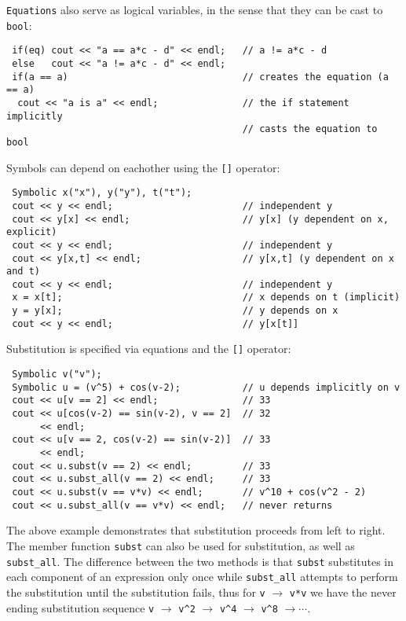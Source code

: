 \documentclass[12pt,a4paper]{report}
\begin{document}
\verb|Equations| also serve as logical variables, in the sense that they
can be cast to \verb|bool|:
\begin{verbatim}
 if(eq) cout << "a == a*c - d" << endl;   // a != a*c - d
 else   cout << "a != a*c - d" << endl;
 if(a == a)                               // creates the equation (a == a)
  cout << "a is a" << endl;               // the if statement implicitly
                                          // casts the equation to bool
\end{verbatim}

Symbols can depend on eachother using the \verb|[]| operator:
\begin{verbatim}
 Symbolic x("x"), y("y"), t("t");
 cout << y << endl;                       // independent y
 cout << y[x] << endl;                    // y[x] (y dependent on x, explicit)
 cout << y << endl;                       // independent y
 cout << y[x,t] << endl;                  // y[x,t] (y dependent on x and t)
 cout << y << endl;                       // independent y
 x = x[t];                                // x depends on t (implicit)
 y = y[x];                                // y depends on x
 cout << y << endl;                       // y[x[t]]
\end{verbatim}

Substitution is specified via equations and the \verb|[]| operator:
\begin{verbatim}
 Symbolic v("v");
 Symbolic u = (v^5) + cos(v-2);           // u depends implicitly on v
 cout << u[v == 2] << endl;               // 33
 cout << u[cos(v-2) == sin(v-2), v == 2]  // 32
      << endl;
 cout << u[v == 2, cos(v-2) == sin(v-2)]  // 33
      << endl;
 cout << u.subst(v == 2) << endl;         // 33
 cout << u.subst_all(v == 2) << endl;     // 33
 cout << u.subst(v == v*v) << endl;       // v^10 + cos(v^2 - 2)
 cout << u.subst_all(v == v*v) << endl;   // never returns
\end{verbatim}

The above example demonstrates that substitution proceeds from left to
right. The member function \verb|subst| can also be used for substitution,
as well as \verb|subst_all|. The difference between the two methods is that
\verb|subst| substitutes in each component of an expression only once
while \verb|subst_all| attempts to perform the substitution until the
substitution fails, thus for \verb|v| $\to$ \verb|v*v| we have the
never ending substitution sequence
\verb|v| $\to$ \verb|v^2| $\to$ \verb|v^4| $\to$ \verb|v^8| $\to\cdots$.\\
\end{document}
